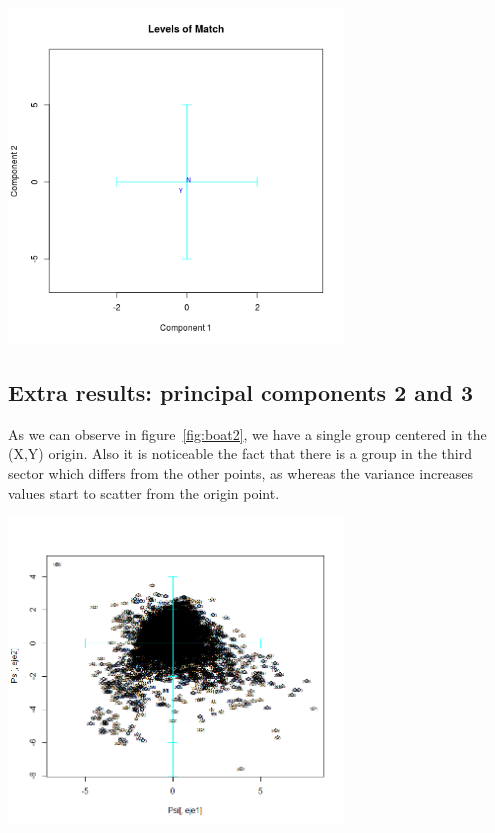 \begin{center}
\includegraphics[width=3.5in]{images/ACP/x-1_y-2b-2-match.png}
\label{fig:aLabelForReferencing}
\end{center}

\subsection{Extra results: principal components 2 and 3}

As we can observe in figure~\ref{fig:boat2}, we have a single group centered in the (X,Y) origin. Also it is noticeable the fact that there is a group in the third sector which differs from the other points, as whereas the variance increases values start to scatter from the origin point. 
\begin{center}
\includegraphics[width=3.5in]{images/ACP/2-3iteration/individuals-2-3.png}
\label{fig:boat2}
\end{center}

